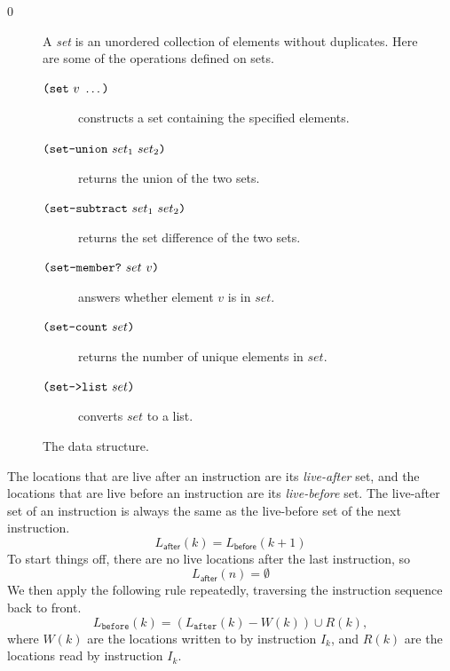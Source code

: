 \documentclass[7x10]{TimesAPriori_MIT}%
\def\racketEd{0}
\def\edition{1}
\numberwithin{theorem}{chapter}
\numberwithin{definition}{chapter}
\numberwithin{equation}{chapter}
\begin{document}
{\if\edition\racketEd
\begin{figure}[tp]
  \small
  \begin{tcolorbox}[title=\href{https://docs.racket-lang.org/reference/sets.html}{The Racket Set Package}]
    A \emph{set} is an unordered collection of elements without duplicates.
    Here are some of the operations defined on sets.
  \begin{description}
  \item[$\texttt{(}\texttt{set}~v~\ldots\texttt{)}$] constructs a set containing the specified elements.
  \item[$\texttt{(}\texttt{set-union}~set_1~set_2\texttt{)}$] returns the union of the two sets.
  \item[$\texttt{(}\texttt{set-subtract}~set_1~set_2\texttt{)}$] returns the set
    difference of the two sets.
  \item[$\texttt{(}\texttt{set-member?}~set~v\texttt{)}$] answers whether element $v$ is in $set$.
  \item[$\texttt{(}\texttt{set-count}~set\texttt{)}$] returns the number of unique elements in $set$.
  \item[$\texttt{(}\texttt{set->list}~set\texttt{)}$] converts $set$ to a list.
  \end{description}
  \end{tcolorbox}
  \caption{The  data structure.}
  \label{fig:set}
\end{figure}
\fi}


The locations that are live after an instruction are its
\emph{live-after} set, and the locations
that are live before an instruction are its
\emph{live-before} set. The live-after
set of an instruction is always the same as the live-before set of the
next instruction.
\begin{equation} \label{eq:live-after-before-next}
  L_{\mathsf{after}}(k) = L_{\mathsf{before}}(k+1)
\end{equation}
To start things off, there are no live locations after the last
instruction, so
\begin{equation}\label{eq:live-last-empty}
  L_{\mathsf{after}}(n) = \emptyset
\end{equation}
We then apply the following rule repeatedly, traversing the
instruction sequence back to front.
\begin{equation}\label{eq:live-before-after-minus-writes-plus-reads}
  L_{\mathtt{before}}(k) = (L_{\mathtt{after}}(k) - W(k)) \cup R(k),
\end{equation}
where $W(k)$ are the locations written to by instruction $I_k$, and
$R(k)$ are the locations read by instruction $I_k$.
\end{document}
